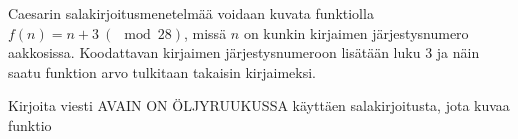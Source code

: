 \begin{tehtavasivu}
\begin{tehtava}
	Caesarin salakirjoitusmenetelmää voidaan kuvata funktiolla $f(n) = n + 3 \ (\mod 28)$, missä $n$ on kunkin kirjaimen järjestysnumero aakkosissa. Koodattavan kirjaimen järjestysnumeroon lisätään luku $3$ ja näin saatu funktion arvo tulkitaan takaisin kirjaimeksi.

	Kirjoita viesti AVAIN ON ÖLJYRUUKUSSA käyttäen salakirjoitusta, jota kuvaa funktio 
	
	\begin{vastaus}
	\end{vastaus}
\end{tehtava}

\end{tehtavasivu}



